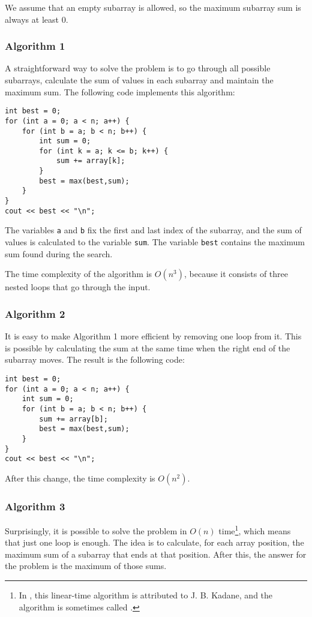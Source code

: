 We assume that an empty subarray is allowed,
so the maximum subarray sum is always at least $0$.

\subsubsection{Algorithm 1}

A straightforward way to solve the problem
is to go through all possible subarrays,
calculate the sum of values in each subarray and maintain
the maximum sum.
The following code implements this algorithm:

\begin{lstlisting}
int best = 0;
for (int a = 0; a < n; a++) {
    for (int b = a; b < n; b++) {
        int sum = 0;
        for (int k = a; k <= b; k++) {
            sum += array[k];
        }
        best = max(best,sum);
    }
}
cout << best << "\n";
\end{lstlisting}

The variables \texttt{a} and \texttt{b} fix the first and
last index of the subarray,
and the sum of values is calculated to the variable \texttt{sum}.
The variable \texttt{best} contains the maximum sum found during the search.

The time complexity of the algorithm is $O(n^3)$,
because it consists of three nested loops 
that go through the input.

\subsubsection{Algorithm 2}

It is easy to make Algorithm 1 more efficient
by removing one loop from it.
This is possible by calculating the sum at the same
time when the right end of the subarray moves.
The result is the following code:

\begin{lstlisting}
int best = 0;
for (int a = 0; a < n; a++) {
    int sum = 0;
    for (int b = a; b < n; b++) {
        sum += array[b];
        best = max(best,sum);
    }
}
cout << best << "\n";
\end{lstlisting}
After this change, the time complexity is $O(n^2)$.

\subsubsection{Algorithm 3}

Surprisingly, it is possible to solve the problem
in $O(n)$ time\footnote{In \cite{ben86}, this linear-time algorithm
is attributed to J. B. Kadane, and the algorithm is sometimes
called  .}, which means
that just one loop is enough.
The idea is to calculate, for each array position,
the maximum sum of a subarray that ends at that position.
After this, the answer for the problem is the
maximum of those sums.

